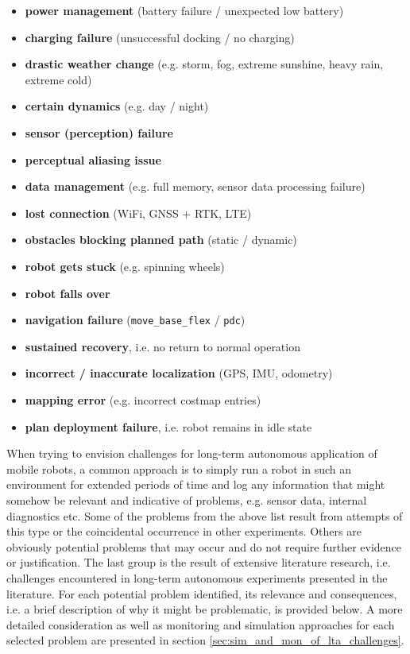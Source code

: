 \documentclass[english, master, utf8]{base/thesis_KBS}
\newcommand{\code}[1]{\colorbox{light-gray}{\texttt{#1}}}
\begin{document}
\begin{itemize}
    \item \textbf{power management} (battery failure / unexpected low battery)
    \item \textbf{charging failure} (unsuccessful docking / no charging)
    \item \textbf{drastic weather change} (e.g. storm, fog, extreme sunshine, heavy rain, extreme cold)
    \item \textbf{certain dynamics} (e.g. day / night)
    \item \textbf{sensor (perception) failure}
    \item \textbf{perceptual aliasing issue}
    \item \textbf{data management} (e.g. full memory, sensor data processing failure)
    \item \textbf{lost connection} (WiFi, GNSS + RTK, LTE)
    \item \textbf{obstacles blocking planned path} (static / dynamic)
    \item \textbf{robot gets stuck} (e.g. spinning wheels)
    \item \textbf{robot falls over}
    \item \textbf{navigation failure} (\code{move\_base\_flex} / \code{pdc})
    \item \textbf{sustained recovery}, i.e. no return to normal operation
    \item \textbf{incorrect / inaccurate localization} (GPS, IMU, odometry)
    \item \textbf{mapping error} (e.g. incorrect costmap entries)
    \item \textbf{plan deployment failure}, i.e. robot remains in idle state
\end{itemize}
When trying to envision challenges for long-term autonomous application of mobile robots, a common approach is to simply run a robot in such an environment for extended periods
of time and log any information that might somehow be relevant and indicative of problems, e.g. sensor data, internal diagnostics etc. \cite{Biswas:2016}
Some of the problems from the above list result from attempts of this type or the coincidental occurrence in other experiments. Others are obviously potential problems that may occur
and do not require further evidence or justification. The last group is the result of extensive literature research, i.e. challenges encountered in long-term autonomous experiments
presented in the literature. For each potential problem identified, its relevance and consequences, i.e. a brief description of why it might be problematic, is provided below.
A more detailed consideration as well as monitoring and simulation approaches for each selected problem are presented in section \ref{sec:sim_and_mon_of_lta_challenges}.\newline
\end{document}
